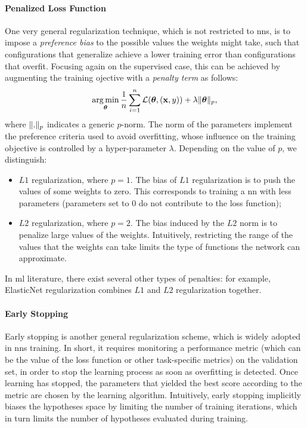 \paragraph{Penalized Loss Function}
One very general regularization technique, which is not restricted to \glspl{nn}, is to impose a \emph{preference bias} to the possible values the weights might take, such that configurations that generalize achieve a lower training error than configurations that overfit. Focusing again on the supervised case, this can be achieved by augmenting the training ojective with a \emph{penalty term} as follows:
$$\argmin_{\Param} \frac{1}{n} \sum_{i=1}^n \Loss(\Param, (\Vector{x}, y)) + \lambda\norm{\Param}_p,$$
where $\mathopen\| . \mathclose\|_p$ indicates a generic $p$-norm. The norm of the parameters implement the preference criteria used to avoid overfitting, whose influence on the training objective is controlled by a hyper-parameter $\lambda$. Depending on the value of $p$, we distinguish:
\begin{itemize}
    \item $L1$ regularization, where $p=1$. The bias of $L1$ regularization is to push the values of some weights to zero. This corresponds to training a \gls{nn} with less parameters (parameters set to 0 do not contribute to the loss function);
    \item $L2$ regularization, where $p=2$. The bias induced by the $L2$ norm is to penalize large values of the weights. Intuitively, restricting the range of the values that the weights can take limits the type of functions the network can approximate.
\end{itemize}
In \gls{ml} literature, there exist several other types of penalties: for example, ElasticNet regularization combines $L1$ and $L2$ regularization together.

\paragraph{Early Stopping}
Early stopping is another general regularization scheme, which is widely adopted in \glspl{nn} training. In short, it requires monitoring a performance metric (which can be the value of the loss function or other task-specific metrics) on the validation set, in order to stop the learning process as soon as overfitting is detected. Once learning has stopped, the parameters that yielded the best score according to the metric are chosen by the learning algorithm. Intuitively, early stopping implicitly biases the hypotheses space by limiting the number of training iterations, which in turn limits the number of hypotheses evaluated during training. 

